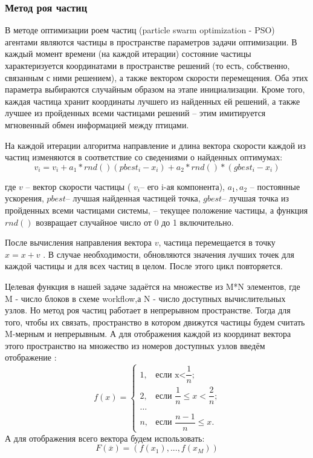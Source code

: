 \documentclass[a4paper,12pt]{article}
\begin{document}
\subsubsection{Метод роя частиц}
  В методе оптимизации роем частиц (particle swarm optimization - PSO) агентами являются частицы в пространстве параметров задачи оптимизации. В каждый момент времени (на каждой итерации) состояние частицы характеризуется координатами в пространстве решений (то есть, собственно, связанным с ними решением), а также вектором скорости перемещения. Оба этих параметра выбираются случайным образом на этапе инициализации. Кроме того, каждая частица хранит координаты лучшего из найденных ей решений, а также лучшее из пройденных всеми частицами решений – этим имитируется мгновенный обмен информацией между птицами.

На каждой итерации алгоритма направление и длина вектора скорости каждой из частиц изменяются в соответствие со сведениями о найденных оптимумах:
\begin{equation}
v_{i} = v_{i} + a_{1}*rnd()(pbest_{i} - x_{i}) + a_2*rnd()*(gbest_{i} - x_{i})
\end{equation}

где $v$ – вектор скорости частицы ( $v_{i}$– его i-ая компонента), $a_{1}, a_{2}$ – постоянные ускорения, $pbest$– лучшая найденная частицей точка, $gbest$– лучшая точка из пройденных всеми частицами системы, – текущее положение частицы, а функция $rnd()$ возвращает случайное число от 0 до 1 включительно.

После вычисления направления вектора $v$, частица перемещается в точку $x = x + v$ . В случае необходимости, обновляются значения лучших точек для каждой частицы и для всех частиц в целом. После этого цикл повторяется.


Целевая функция в нашей задаче задаётся на множестве из M*N элементов, где M - число блоков в схеме workflow,а N - число доступных вычислительных узлов. Но метод роя частиц работает в непрерывном пространстве. 
Тогда для того, чтобы их связать, пространство в котором движутся частицы будем считать M-мерным и непрерывным. А для отображения каждой из координат вектора этого пространство на множество из номеров доступных узлов введём отображение : $$f(x)=
\begin{cases}
1,&\text{если x<$\dfrac{1}{n}$;}\\
2,&\text{если $\dfrac{1}{n} \leq x <\dfrac{2}{n}$;}\\
\dots \\
n,&\text{если $\dfrac{n-1}{n} \leq x$.}
\end{cases}
$$
А для отображения всего вектора будем использовать:
$$
F(\overline{x})= (f(x_{1}), ..., f(x_{M}))
$$
\end{document}
